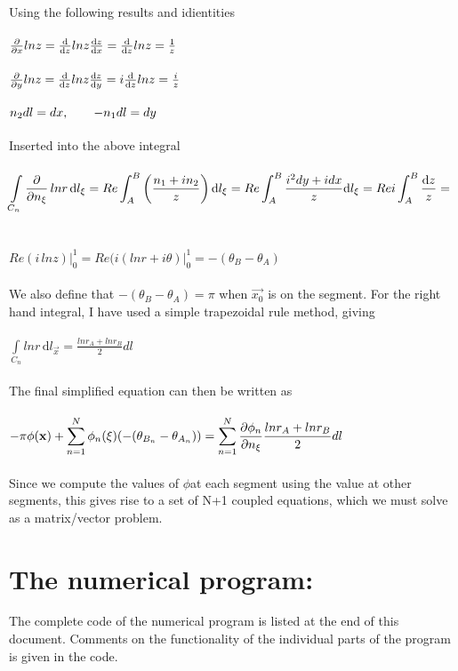 \documentclass[a4paper,english,11pt,twoside]{article}
\newcommand{\tab}{\hspace*{2em}}
\begin{document}
\\
Using the following results and idientities\\
\\
$\frac{\partial }{\partial x}lnz = \frac{\mathrm d}{\mathrm d z}lnz\frac{\mathrm d z}{\mathrm d x} = \frac{\mathrm d}{\mathrm d z}lnz = \frac{1}{z}$\\
\\
$\frac{\partial }{\partial y}lnz = \frac{\mathrm d}{\mathrm d z}lnz\frac{\mathrm d z}{\mathrm d y} = i\frac{\mathrm d}{\mathrm d z}lnz = \frac{i}{z}$\\
\\
$n_2dl = dx,\tab -n_1dl = dy$
\\
\\
Inserted into the above integral\\
\\
$\displaystyle\int\limits_{C_n}\frac{\partial }{\partial n_{\mathbf{\xi}}}\, lnr\, \mathrm{d}l_{\mathbf{\xi}} = Re\displaystyle\int_A^B\left(\frac{n_1 + in_2}{z}\right) \mathrm{d}l_{\mathbf{\xi}} = Re\displaystyle\int_A^B\frac{i^2dy + idx}{z} \mathrm{d}l_{\mathbf{\xi}} = Re i\displaystyle\int_A^B\frac{\mathrm d z}{z} = $\\
\\
\\
$Re(i\, lnz)\big|_0^1 = Re(i(lnr + i\theta)\big|_0^1 = -(\theta_B - \theta_A)$\\
\\We also define that $-(\theta_B - \theta_A)=\pi$ when $\vec{x_0}$ is on the segment.
\newpage
For the right hand integral, I have used a simple trapezoidal rule method, giving\\
\\
$\int\limits_{C_n} lnr\, \mathrm{d}l_{\vec{x}} = \frac{lnr_A + lnr_B}{2}dl$\\
\\
The final simplified equation can then be written as\\
\\
$-\pi\phi(\mathbf{x}) +\displaystyle\displaystyle\sum_{n=1}^{N}\phi_n(\mathbf{\xi})(-(\theta_{B_n} - \theta_{A_n})) = \displaystyle\displaystyle\sum_{n=1}^{N}\frac{\partial \phi_n}{\partial n_{\mathbf{\xi}}}\frac{lnr_A + lnr_B}{2}dl$\\
\\
Since we compute the values of $\phi$at each segment using the value at other segments, this gives rise to a set of N+1 coupled equations, which we must solve as a matrix/vector problem.
\section*{The numerical program:}
The complete code of the numerical program is listed at the end of this document. Comments on the functionality of the individual parts of the program is given in the code.\\
\end{document}
